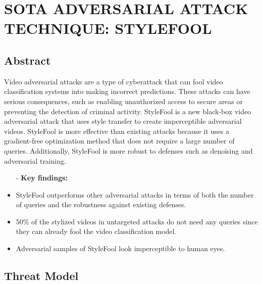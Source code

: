 \section{SOTA ADVERSARIAL ATTACK TECHNIQUE: STYLEFOOL}

\subsection{Abstract}
Video adversarial attacks are a type of cyberattack that can fool video classification systems into making incorrect predictions. These attacks can have serious consequences, such as enabling unauthorized access to secure areas or preventing the detection of criminal activity.
StyleFool is a new black-box video adversarial attack that uses style transfer to create imperceptible adversarial videos. StyleFool is more effective than existing attacks because it uses a gradient-free optimization method that does not require a large number of queries. Additionally, StyleFool is more robust to defenses such as denoising and adversarial training.
\begin{itemize}
    \item[-]\textbf{Key findings:}
    \item StyleFool outperforms other adversarial attacks in terms of both the number of queries and the robustness against existing defenses.
    \item 50\% of the stylized videos in untargeted attacks do not need any queries since they can already fool the video classification model.
    \item Adversarial samples of StyleFool look imperceptible to human eyes.
\end{itemize}

\subsection{Threat Model}

